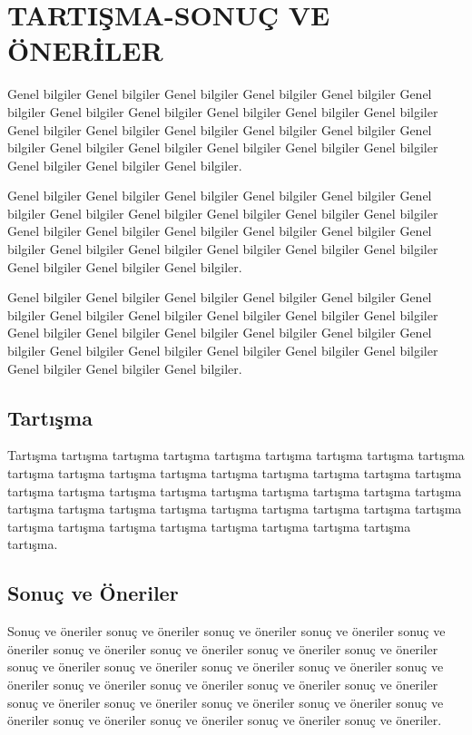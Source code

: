 \chapter{TARTIŞMA-SONUÇ VE ÖNERİLER}

Genel bilgiler Genel bilgiler Genel bilgiler Genel bilgiler Genel bilgiler Genel bilgiler Genel bilgiler Genel bilgiler Genel bilgiler Genel bilgiler Genel bilgiler Genel bilgiler Genel bilgiler Genel bilgiler Genel bilgiler Genel bilgiler Genel bilgiler Genel bilgiler Genel bilgiler Genel bilgiler Genel bilgiler Genel bilgiler Genel bilgiler Genel bilgiler Genel bilgiler.

Genel bilgiler Genel bilgiler Genel bilgiler Genel bilgiler Genel bilgiler Genel bilgiler Genel bilgiler Genel bilgiler Genel bilgiler Genel bilgiler Genel bilgiler Genel bilgiler Genel bilgiler Genel bilgiler Genel bilgiler Genel bilgiler Genel bilgiler Genel bilgiler Genel bilgiler Genel bilgiler Genel bilgiler Genel bilgiler Genel bilgiler Genel bilgiler Genel bilgiler.

Genel bilgiler Genel bilgiler Genel bilgiler Genel bilgiler Genel bilgiler Genel bilgiler Genel bilgiler Genel bilgiler Genel bilgiler Genel bilgiler Genel bilgiler Genel bilgiler Genel bilgiler Genel bilgiler Genel bilgiler Genel bilgiler Genel bilgiler Genel bilgiler Genel bilgiler Genel bilgiler Genel bilgiler Genel bilgiler Genel bilgiler Genel bilgiler Genel bilgiler.

\section{Tartışma}

Tartışma tartışma tartışma tartışma tartışma tartışma tartışma tartışma tartışma tartışma tartışma tartışma tartışma tartışma tartışma tartışma tartışma tartışma tartışma tartışma tartışma tartışma tartışma tartışma tartışma tartışma tartışma tartışma tartışma tartışma tartışma tartışma tartışma tartışma tartışma tartışma tartışma tartışma tartışma tartışma tartışma tartışma tartışma tartışma tartışma.

\section{Sonuç ve Öneriler}

Sonuç ve öneriler sonuç ve öneriler sonuç ve öneriler sonuç ve öneriler sonuç ve öneriler sonuç ve öneriler sonuç ve öneriler sonuç ve öneriler sonuç ve öneriler sonuç ve öneriler sonuç ve öneriler sonuç ve öneriler sonuç ve öneriler sonuç ve öneriler sonuç ve öneriler sonuç ve öneriler sonuç ve öneriler sonuç ve öneriler sonuç ve öneriler sonuç ve öneriler sonuç ve öneriler sonuç ve öneriler sonuç ve öneriler sonuç ve öneriler sonuç ve öneriler sonuç ve öneriler sonuç ve öneriler.